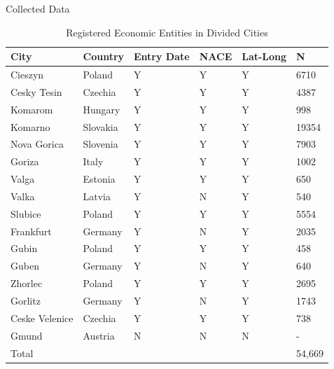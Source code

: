\documentclass[]{beamer}
\begin{document}
 \begin{frame}{Collected Data }
\scriptsize
    \begin{table}[H]\centering \caption{Registered Economic Entities in Divided Cities \label{descstat}}
\begin{tabular}{|ll|lll|l|}
\hline
\textbf{City}  & \textbf{Country} & \textbf{Entry Date} & \textbf{NACE} & \textbf{Lat-Long}  & \textbf{N} \\
\hline
\hline
Cieszyn        & Poland           & Y                       & Y        & Y   & 6710     \\

Cesky Tesin    & Czechia          & Y                      & Y        & Y   &4387     \\
\hline
Komarom        & Hungary          & Y                      & Y        & Y      & 998  \\

Komarno        & Slovakia         & Y                       & Y        & Y   & 19354     \\
\hline
Nova Gorica    & Slovenia         & Y                     & Y        & Y    &  7903    \\

Goriza         & Italy            & Y            & Y            & Y          &  1002     \\
\hline
Valga          & Estonia          & Y            & Y           & Y            &650   \\

Valka          & Latvia           & Y            & N            & Y            & 540    \\
\hline
Slubice        & Poland           & Y            & Y           & Y             & 5554 \\

Frankfurt      & Germany          & Y            & N            & Y           & 2035    \\
\hline
Gubin          & Poland           & Y            & Y           & Y          & 458    \\

Guben          & Germany          & Y             & N            & Y           & 640     \\
\hline
Zhorlec        & Poland           & Y            & Y           & Y         &2695      \\

Gorlitz        & Germany          & Y             & N            & Y            & 1743     \\
\hline
Ceske Velenice & Czechia          & Y            & Y           & Y     & 738    \\

Gmund          & Austria          & N             & N            & N         & -    
 \\
\hline
\hline
Total          &           &                         &          &   & 54,669   \\
\hline
\end{tabular}
\end{table}

\end{frame}
    
\end{document}
